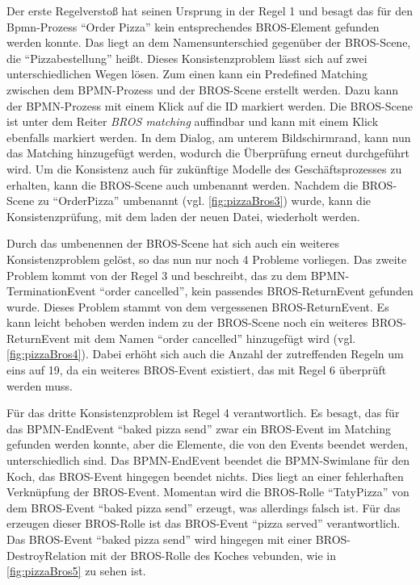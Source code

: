 Der erste Regelverstoß hat seinen Ursprung in der Regel 1 und besagt das für den Bpmn-Prozess ``Order Pizza'' kein entsprechendes BROS-Element gefunden werden konnte.
Das liegt an dem Namensunterschied gegenüber der BROS-Scene, die ``Pizzabestellung'' heißt.
Dieses Konsistenzproblem lässt sich auf zwei unterschiedlichen Wegen lösen.
Zum einen kann ein Predefined Matching zwischen dem BPMN-Prozess und der BROS-Scene erstellt werden.
Dazu kann der BPMN-Prozess mit einem Klick auf die ID markiert werden.
Die BROS-Scene ist unter dem Reiter \emph{BROS matching} auffindbar und kann mit einem Klick ebenfalls markiert werden.
In dem Dialog, am unterem Bildschirmrand, kann nun das Matching hinzugefügt werden, wodurch die Überprüfung erneut durchgeführt wird.
Um die Konsistenz auch für zukünftige Modelle des Geschäftsprozesses zu erhalten, kann die BROS-Scene auch umbenannt werden.
Nachdem die BROS-Scene zu ``OrderPizza'' umbenannt (vgl. \cref{fig:pizzaBros3}) wurde, kann die Konsistenzprüfung, mit dem laden der neuen Datei, wiederholt werden.

\pagebreak
Durch das umbenennen der BROS-Scene hat sich auch ein weiteres Konsistenzproblem gelöst, so das nun nur noch 4 Probleme vorliegen.
Das zweite Problem kommt von der Regel 3 und beschreibt, das zu dem BPMN-TerminationEvent ``order cancelled'', kein passendes BROS-ReturnEvent gefunden wurde.
Dieses Problem stammt von dem vergessenen BROS-ReturnEvent.
Es kann leicht behoben werden indem zu der BROS-Scene noch ein weiteres BROS-ReturnEvent mit dem Namen ``order cancelled'' hinzugefügt wird (vgl. \cref{fig:pizzaBros4}). 
Dabei erhöht sich auch die Anzahl der zutreffenden Regeln um eins auf 19, da ein weiteres BROS-Event existiert, das mit Regel 6 überprüft werden muss.

Für das dritte Konsistenzproblem ist Regel 4 verantwortlich.
Es besagt, das für das BPMN-EndEvent ``baked pizza send'' zwar ein BROS-Event im Matching gefunden werden konnte, aber die Elemente, die von den Events beendet werden, unterschiedlich sind.
Das BPMN-EndEvent beendet die BPMN-Swimlane für den Koch, das BROS-Event hingegen beendet nichts.
Dies liegt an einer fehlerhaften Verknüpfung der BROS-Event.
Momentan wird die BROS-Rolle ``TatyPizza'' von dem BROS-Event ``baked pizza send'' erzeugt, was allerdings falsch ist.
Für das erzeugen dieser BROS-Rolle ist das BROS-Event ``pizza served'' verantwortlich.
Das BROS-Event ``baked pizza send'' wird hingegen mit einer BROS-DestroyRelation mit der BROS-Rolle des Koches vebunden, wie in \cref{fig:pizzaBros5} zu sehen ist.

